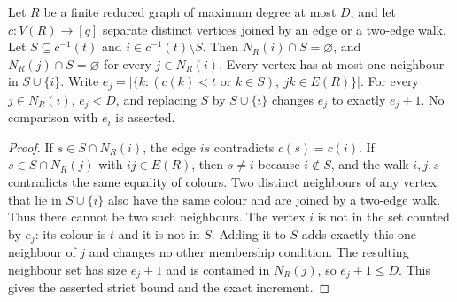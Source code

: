 \begin{lemma}
Let $R$ be a finite reduced graph of maximum degree at most $D$, and let
$c:V(R)\to[q]$ separate distinct vertices joined by an edge or a two-edge
walk. Let $S\subseteq c^{-1}(t)$ and $i\in c^{-1}(t)\setminus S$.
Then $N_R(i)\cap S=\varnothing$, and $N_R(j)\cap S=\varnothing$ for
every $j\in N_R(i)$. Every vertex has at most one neighbour in
$S\cup\{i\}$. Write
$e_j=|\{k:(c(k)<t\text{ or }k\in S),\ jk\in E(R)\}|$.
For every $j\in N_R(i)$, $e_j<D$, and replacing $S$ by $S\cup\{i\}$
changes $e_j$ to exactly $e_j+1$. No comparison with $e_i$ is asserted.
\end{lemma}
\begin{proof}
If $s\in S\cap N_R(i)$, the edge $is$ contradicts $c(s)=c(i)$.
If $s\in S\cap N_R(j)$ with $ij\in E(R)$, then $s\ne i$ because
$i\notin S$, and the walk $i,j,s$ contradicts the same equality of
colours. Two distinct neighbours of any vertex that lie in $S\cup\{i\}$
also have the same colour and are joined by a two-edge walk. Thus there
cannot be two such neighbours.
The vertex $i$ is not in the set counted by $e_j$: its colour is $t$ and
it is not in $S$. Adding it to $S$ adds exactly this one neighbour of
$j$ and changes no other membership condition. The resulting neighbour
set has size $e_j+1$ and is contained in $N_R(j)$, so $e_j+1\le D$.
This gives the asserted strict bound and the exact increment.
\end{proof}
